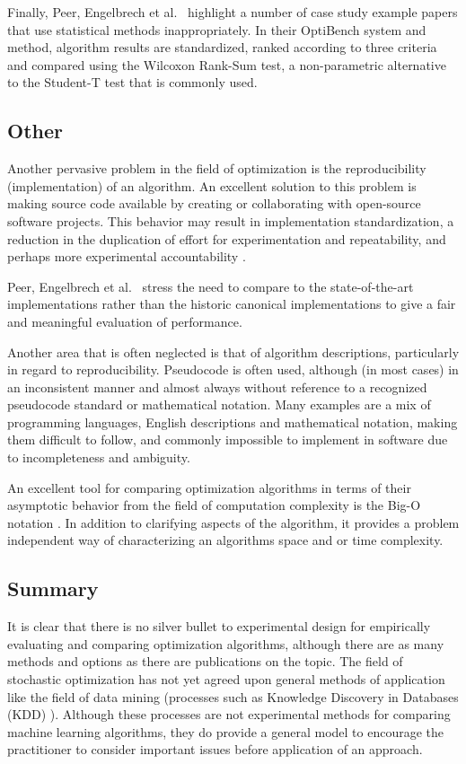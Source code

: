 Finally, Peer, Engelbrech et al.\ \cite{Peer2003} highlight a number of case study example papers that use statistical methods inappropriately. In their OptiBench system and method, algorithm results are standardized, ranked according to three criteria and compared using the Wilcoxon Rank-Sum test, a non-parametric alternative to the Student-T test that is commonly used.

% 
% 
\subsection{Other}
Another pervasive problem in the field of optimization is the reproducibility (implementation) of an algorithm. An excellent solution to this problem is making source code available by creating or collaborating with open-source software projects. This behavior may result in implementation standardization, a reduction in the duplication of effort for experimentation and repeatability, and perhaps more experimental accountability \cite{Eiben2002, Peer2003}.

Peer, Engelbrech et al.\ \cite{Peer2003} stress the need to compare to the state-of-the-art implementations rather than the historic canonical implementations to give a fair and meaningful evaluation of performance.

Another area that is often neglected is that of algorithm descriptions, particularly in regard to reproducibility. Pseudocode is often used, although (in most cases) in an inconsistent manner and almost always without reference to a recognized pseudocode standard or mathematical notation. Many examples are a mix of programming languages, English descriptions and mathematical notation, making them difficult to follow, and commonly impossible to implement in software due to incompleteness and ambiguity.

An excellent tool for comparing optimization algorithms in terms of their asymptotic behavior from the field of computation complexity is the Big-O notation \cite{Cormen2001}. In addition to clarifying aspects of the algorithm, it provides a problem independent way of characterizing an algorithms space and or time complexity.


% 
% 
\subsection{Summary}
It is clear that there is no silver bullet to experimental design for empirically evaluating and comparing optimization algorithms, although there are as many methods and options as there are publications on the topic. The field of stochastic optimization has not yet agreed upon general methods of application like the field of data mining (processes such as Knowledge Discovery in Databases (KDD) \cite{Fayyad1996}). Although these processes are not experimental methods for comparing machine learning algorithms, they do provide a general model to encourage the practitioner to consider important issues before application of an approach.

